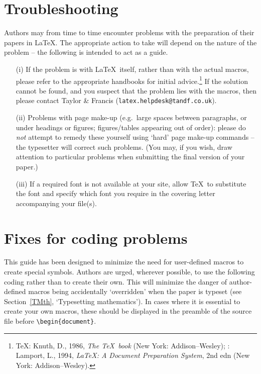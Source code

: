 \documentclass[]{tEIS2e}
\theoremstyle{plain}
\theoremstyle{remark}
\begin{document}
\section{Troubleshooting}

Authors may from time to time encounter problems with the  preparation
of their papers in \LaTeX. The appropriate  action  to
take will depend on the nature of the problem -- the following is
intended to act as a guide.
%
\begin{enumerate}
\item[(i)] If the problem is with \LaTeX\ itself, rather than with the
actual macros, please refer to the appropriate handbooks for
initial advice.\footnote{\TeX: Knuth, D., 1986, {\it The \TeX\
book} (New York: Addison--Wesley); \LaTeXe: Lamport, L., 1994,
{\it \LaTeX: A Document Preparation System}, 2nd edn (New
York: Addison--Wesley).} If the solution cannot be found, and you
suspect that the problem lies with the macros, then please contact
Taylor \& Francis ({\tt latex.helpdesk@tandf.co.uk}).

\item[(ii)] Problems with page make-up (e.g.\ large spaces between paragraphs, or under headings or
figures; figures/tables appearing out of order):
please do {\itshape not\/} attempt to remedy these yourself using
`hard' page make-up commands -- the typesetter will correct such
problems. (You may, if you wish, draw attention to particular
problems when submitting the final version of your paper.)

\item[(iii)] If a required font is not available at your site, allow \TeX\
to substitute the font and specify which font you require in the
covering letter accompanying your file(s).
\end{enumerate}


\section{Fixes for coding problems}

This guide has been designed to minimize the need for user-defined macros to  create special symbols. Authors
are urged, wherever possible, to use the following coding rather than to create their own. This will minimize
the danger of author-defined macros being accidentally `overridden' when the paper is typeset (see
Section~\ref{TMth}, `Typesetting mathematics'). In cases where it is essential to create your own macros,
these should be displayed in the preamble of the source file before \verb"\begin{document}".
\end{document}
